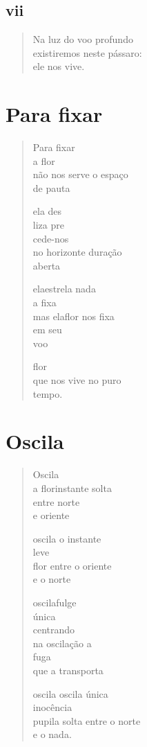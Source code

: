\medskip
\section{vii}

\begin{verse}
Na luz do voo profundo\\
existiremos neste pássaro:\\
ele nos vive.
\end{verse}

\chapter{Para fixar}

\begin{verse}
Para fixar\\
a flor\\
não nos serve o espaço\\
de pauta

ela des\\
liza pre\\
cede-nos\\
no horizonte duração\\
\quad\quad\quad aberta

elaestrela nada\\
a fixa\\
mas elaflor nos fixa\\
em seu\\
voo

flor\\
que nos vive no puro\\
tempo.
\end{verse}

\chapter{Oscila}

\begin{verse}
Oscila\\
a florinstante solta\\
entre norte\\
e oriente

\quad\quad\quad\quad{}oscila o instante\\
\quad\quad\quad\quad{}leve\\
\quad\quad\quad\quad{}flor entre o oriente\\
\quad\quad\quad\quad{}e o norte

oscilafulge\\
única\\
centrando\\
na oscilação a\\
fuga\\
que a transporta

\quad\quad\quad\quad{}oscila oscila única\\ \quad\quad\quad\quad{}inocência\\
\quad\quad\quad\quad{}pupila solta entre o norte\\
\quad\quad\quad\quad{}e o nada.
\end{verse}

